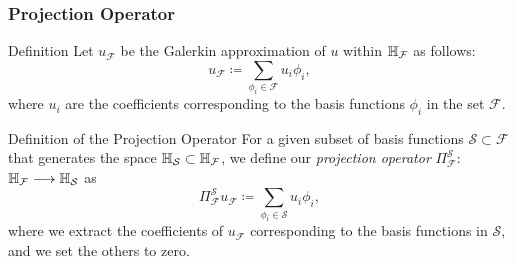 \begin{frame}
\frametitle{Projection Operator}
\begin{block}{Definition}
    Let \( u_{\mathcal{F}} \) be the Galerkin approximation of \( u \) within \( \mathbb{H}_{\mathcal{F}} \) as follows:
    \begin{equation}
       u_{\mathcal{F}} \coloneqq \sum_{\phi_{i} \in \mathcal{F}} u_{i} \phi_{i},
    \end{equation}
    where \( u_{i} \) are the coefficients corresponding to the basis functions \( \phi_{i} \) in the set \( \mathcal{F} \). 
    \end{block}
    \begin{block}{Definition of the Projection Operator}
        For a given subset of basis functions $\mathcal{S} \subset \mathcal{F}$ that generates the space $\mathbb{H}_{\mathcal{S}} \subset \mathbb{H}_{\mathcal{F}}$, we define our \emph{projection operator} $\Pi_{\mathcal{F}}^{\mathcal{S}}$: $\mathbb{H} _{\mathcal{F}} \longrightarrow \mathbb{H}_{\mathcal{S}}$ as
        \begin{equation}
            \Pi_{\mathcal{F}}^{\mathcal{S}} u_{\mathcal{F}} \coloneqq \sum_{\phi_{i} \in \mathcal{S}} u_{i} \phi_{i},
        \end{equation}
        where we extract the coefficients of $u_{\mathcal{F}}$ corresponding to the basis functions in $\mathcal{S}$, and we set the others to zero.
    \end{block}
\end{frame}

